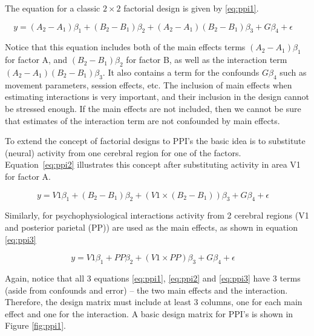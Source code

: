 The equation for a classic $2 \times 2$ factorial design is given by \ref{eq:ppi1}.

\begin{equation}
	\mbox{$y=(A_{2}-A_{1})\beta_{1}+(B_{2}-B_{1})\beta_2+(A_{2}-A_{1})(B_{2}-B_{1})\beta_{3}+G\beta_{4} +\epsilon\quad$}
	\label{eq:ppi1}
\end{equation}

Notice that this equation includes both of the main effects  terms $(A_{2}-A_{1})\beta_{1}$ for factor A, and $(B_{2}-B_{1})\beta_{2}$ for factor B, as well as the interaction term $(A_{2}-A_{1})(B_{2}-B_{1})\beta_{3}$. It also contains a term for the confounds $G\beta_{4}$ such as movement parameters, session effects, etc. The inclusion of main effects when estimating interactions is very important, and their inclusion in the design cannot be stressed enough. If the main effects are not included, then we cannot be sure that estimates of the interaction term are not confounded by main effects.

To extend the concept of factorial designs to PPI's the basic idea is to substitute (neural) activity from one cerebral region for one of the factors. Equation~\ref{eq:ppi2} illustrates this concept after substituting activity in area V1 for factor A.

\begin{equation}
	\mbox{$y=V1\beta_{1}+(B_{2}-B_{1})\beta_2+(V1\times(B_{2}-B_{1}))\beta_3+G\beta_4 +\epsilon\quad$}
	\label{eq:ppi2}
\end{equation}

Similarly, for psychophysiological interactions activity from 2 cerebral regions (V1 and posterior parietal (PP)) are used as the main effects, as shown in equation \ref{eq:ppi3}

\begin{equation}
	\mbox{$y=V1\beta_{1}+PP\beta_2+(V1\times PP)\beta_3+G\beta_4 +\epsilon\quad$}
	\label{eq:ppi3}
\end{equation}

Again, notice that all 3 equations \ref{eq:ppi1}, \ref{eq:ppi2} and \ref{eq:ppi3} have 3 terms (aside from confounds and error) -- the two main effects and the interaction. Therefore, the design matrix must include at least 3 columns, one for each main effect and one for the interaction. A basic design matrix for PPI's is shown in Figure \ref{fig:ppi1}.

